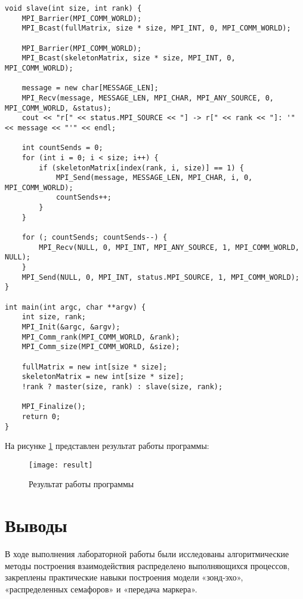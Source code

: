 \documentclass[a4paper,14pt]{extarticle}
\begin{document}
\begin{lstlisting}
void slave(int size, int rank) { 
    MPI_Barrier(MPI_COMM_WORLD); 
    MPI_Bcast(fullMatrix, size * size, MPI_INT, 0, MPI_COMM_WORLD); 
  
    MPI_Barrier(MPI_COMM_WORLD); 
    MPI_Bcast(skeletonMatrix, size * size, MPI_INT, 0, MPI_COMM_WORLD); 
  
    message = new char[MESSAGE_LEN]; 
    MPI_Recv(message, MESSAGE_LEN, MPI_CHAR, MPI_ANY_SOURCE, 0, MPI_COMM_WORLD, &status); 
    cout << "r[" << status.MPI_SOURCE << "] -> r[" << rank << "]: '" << message << "'" << endl; 
  
    int countSends = 0; 
    for (int i = 0; i < size; i++) { 
        if (skeletonMatrix[index(rank, i, size)] == 1) { 
            MPI_Send(message, MESSAGE_LEN, MPI_CHAR, i, 0, MPI_COMM_WORLD); 
            countSends++; 
        } 
    } 
  
    for (; countSends; countSends--) { 
        MPI_Recv(NULL, 0, MPI_INT, MPI_ANY_SOURCE, 1, MPI_COMM_WORLD, NULL); 
    } 
    MPI_Send(NULL, 0, MPI_INT, status.MPI_SOURCE, 1, MPI_COMM_WORLD); 
} 
  
int main(int argc, char **argv) { 
    int size, rank; 
    MPI_Init(&argc, &argv); 
    MPI_Comm_rank(MPI_COMM_WORLD, &rank); 
    MPI_Comm_size(MPI_COMM_WORLD, &size); 
  
    fullMatrix = new int[size * size]; 
    skeletonMatrix = new int[size * size]; 
    !rank ? master(size, rank) : slave(size, rank); 
  
    MPI_Finalize(); 
    return 0; 
}  
\end{lstlisting}

На рисунке \ref{fig:result} представлен результат работы программы:
\begin{figure}[H]
    \centering
    \texttt{[image: result]}
    \caption{Результат работы программы}
    \label{fig:result}
\end{figure}

\section*{Выводы}
В ходе выполнения лабораторной работы были исследованы алгоритмические методы
построения взаимодействия распределено выполняющихся процессов, закреплены
практические навыки построения модели «зонд-эхо», «распределенных семафоров» и
«передача маркера».
\end{document}
